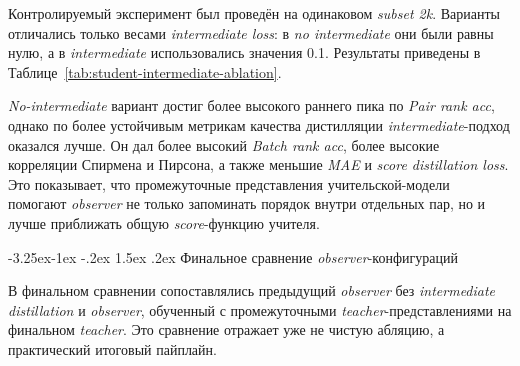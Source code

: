 \documentclass[a4paper,12pt]{extarticle}
\makeatletter
\renewcommand\subsubsection{\@startsection{subsubsection}{3}{\z@}%
  {-3.25ex\@plus -1ex \@minus -.2ex}%
  {1.5ex \@plus .2ex}%
  {\normalfont\normalsize\bfseries\Needspace{5\baselineskip}}}
\makeatother
\begin{document}
Контролируемый эксперимент был проведён на одинаковом \textit{subset 2k}. Варианты отличались только весами \textit{intermediate loss}: в \textit{no intermediate} они были равны нулю, а в \textit{intermediate} использовались значения 0.1. Результаты приведены в Таблице~\ref{tab:student-intermediate-ablation}.

\begin{table}[htbp]
\caption{Влияние дистилляции промежуточных представлений \textit{teacher}-модели}
\label{tab:student-intermediate-ablation}
\centering
\scriptsize
{}
\end{table}

\textit{No-intermediate} вариант достиг более высокого раннего пика по \textit{Pair rank acc}, однако по более устойчивым метрикам качества дистилляции \textit{intermediate}-подход оказался лучше. Он дал более высокий \textit{Batch rank acc}, более высокие корреляции Спирмена и Пирсона, а также меньшие \textit{MAE} и \textit{score distillation loss}. Это показывает, что промежуточные представления учительской-модели помогают \textit{observer} не только запоминать порядок внутри отдельных пар, но и лучше приближать общую \textit{score}-функцию учителя.

\subsubsection{Финальное сравнение \textit{observer}-конфигураций}

В финальном сравнении сопоставлялись предыдущий \textit{observer} без \textit{intermediate distillation} и \textit{observer}, обученный с промежуточными \textit{teacher}-представлениями на финальном \textit{teacher}. Это сравнение отражает уже не чистую абляцию, а практический итоговый пайплайн.
\end{document}
